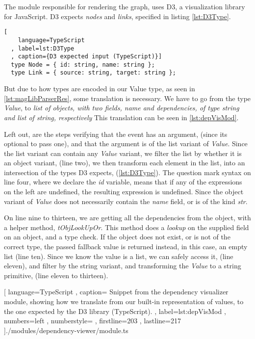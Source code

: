 The module responsible for rendering the graph, uses D3, a visualization library
for JavaScript. D3 expects \textit{nodes} and \textit{links}, specified in
listing \ref{lst:D3Type}.

\begin{lstlisting}[
    language=TypeScript
  , label=lst:D3Type
  , caption={D3 expected input (TypeScript)}]
  type Node = { id: string, name: string };
  type Link = { source: string, target: string };
\end{lstlisting}

But due to how types are encoded in our Value type, as seen in
\ref{lst:magLibParserRes}, some translation is necessary. We have to go from the
type \textit{Value}, to
\textit{
  list of objects, with two fields, name and dependencies, of type string and
  list of string, respectively}
This translation can be seen in \ref{lst:depVisMod}.

Left out, are the steps verifying that the event has an argument,
(since its optional to pass one), and that the argument is of the list variant
of \textit{Value}. Since the list variant can contain any \textit{Value}
variant, we filter the list by whether it is an object variant, (line two), we
then transform each element in the list, into an intersection of the types D3
expects, (\ref{lst:D3Type}). The question mark syntax on line four, where we
declare the \textit{id} variable, means that if any of the expressions on the
left are undefined, the resulting expression is undefined. Since the object
variant of \textit{Value} does not necessarily contain the \textit{name} field,
or is of the kind \textit{str}.

On line nine to thirteen, we are getting all the dependencies from the object,
with a helper method, \textit{tObjLookUpOr}. This method does a \textit{lookup}
on the supplied field on an object, and a type check. If the object does not
exist, or is not of the correct type, the passed fallback value is returned
instead, in this case, an empty list (line ten). Since we know the value is a
list, we can safely access it, (line eleven), and filter by the string variant,
and transforming the \textit{Value} to a string primitive, (line eleven to thirteen).

\begin{code}[H]
  
    [ language=TypeScript
    , caption={
      Snippet from the dependency visualizer module, showing how we translate
      from our built-in representation of values, to the one expected by the D3
      library (TypeScript).
    }
    , label=lst:depVisMod
    , numbers=left
    , numberstyle=\tiny\color{gray}
    , firstline=203
    , lastline=217
    ]{./modules/dependency-viewer/module.ts}
\end{code}


